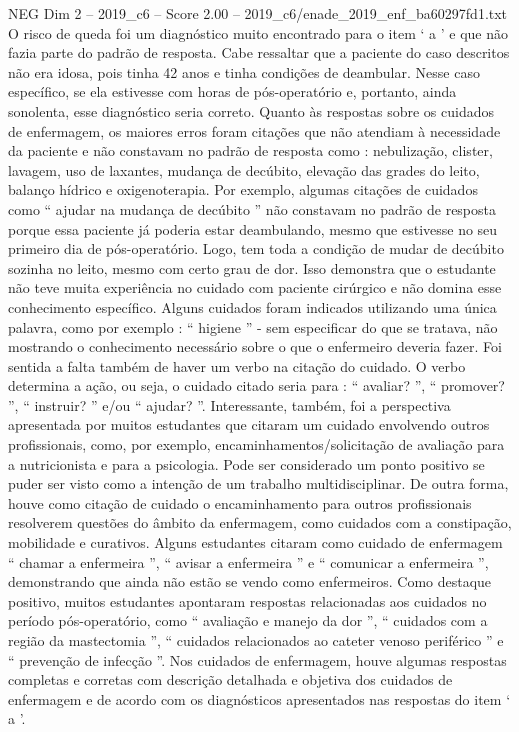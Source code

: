 \begin{textsample}{NEG Dim 2 – 2019\_c6 – Score 2.00 – 2019\_c6/enade\_2019\_enf\_ba60297fd1.txt}
O risco de queda foi um diagnóstico muito encontrado para o item ‘ a ’ e que não fazia parte do padrão de resposta.
Cabe ressaltar que a paciente do caso descritos não era idosa, pois tinha 42 anos e tinha condições de deambular.
Nesse caso específico, se ela estivesse com horas de pós-operatório e, portanto, ainda sonolenta, esse diagnóstico seria correto.
Quanto às respostas sobre os cuidados de enfermagem, os maiores erros foram citações que não atendiam à necessidade da paciente e não constavam no padrão de resposta como : nebulização, clister, lavagem, uso de laxantes, mudança de decúbito, elevação das grades do leito, balanço hídrico e oxigenoterapia.
Por exemplo, algumas citações de cuidados como “ ajudar na mudança de decúbito ” não constavam no padrão de resposta porque essa paciente já poderia estar deambulando, mesmo que estivesse no seu primeiro dia de pós-operatório.
Logo, tem toda a condição de mudar de decúbito sozinha no leito, mesmo com certo grau de dor.
Isso demonstra que o estudante não teve muita experiência no cuidado com paciente cirúrgico e não domina esse conhecimento específico.
Alguns cuidados foram indicados utilizando uma única palavra, como por exemplo : “ higiene ” - sem especificar do que se tratava, não mostrando o conhecimento necessário sobre o que o enfermeiro deveria fazer.
Foi sentida a falta também de haver um verbo na citação do cuidado.
O verbo determina a ação, ou seja, o cuidado citado seria para : “ avaliar? ”, “ promover? ”, “ instruir? ” e/ou “ ajudar? ”.
Interessante, também, foi a perspectiva apresentada por muitos estudantes que citaram um cuidado envolvendo outros profissionais, como, por exemplo, encaminhamentos/solicitação de avaliação para a nutricionista e para a psicologia.
Pode ser considerado um ponto positivo se puder ser visto como a intenção de um trabalho multidisciplinar.
De outra forma, houve como citação de cuidado o encaminhamento para outros profissionais resolverem questões do âmbito da enfermagem, como cuidados com a constipação, mobilidade e curativos.
Alguns estudantes citaram como cuidado de enfermagem “ chamar a enfermeira ”, “ avisar a enfermeira ” e “ comunicar a enfermeira ”, demonstrando que ainda não estão se vendo como enfermeiros.
Como destaque positivo, muitos estudantes apontaram respostas relacionadas aos cuidados no período pós-operatório, como “ avaliação e manejo da dor ”, “ cuidados com a região da mastectomia ”, “ cuidados relacionados ao cateter venoso periférico ” e “ prevenção de infecção ”.
Nos cuidados de enfermagem, houve algumas respostas completas e corretas com descrição detalhada e objetiva dos cuidados de enfermagem e de acordo com os diagnósticos apresentados nas respostas do item ‘ a ’.

\end{textsample}
